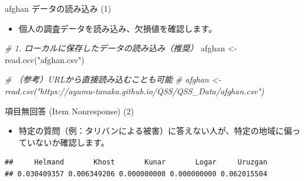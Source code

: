\documentclass[
  ignorenonframetext,
]{beamer}
\newenvironment{Shaded}{\begin{snugshade}}{\end{snugshade}}
\newcommand{\CommentTok}[1]{\textcolor[rgb]{0.56,0.35,0.01}{\textit{#1}}}
\newcommand{\FunctionTok}[1]{\textcolor[rgb]{0.00,0.00,0.00}{#1}}
\newcommand{\NormalTok}[1]{#1}
\newcommand{\OtherTok}[1]{\textcolor[rgb]{0.56,0.35,0.01}{#1}}
\newcommand{\SpecialCharTok}[1]{\textcolor[rgb]{0.00,0.00,0.00}{#1}}
\newcommand{\StringTok}[1]{\textcolor[rgb]{0.31,0.60,0.02}{#1}}
\providecommand{\tightlist}{%
  \setlength{\itemsep}{0pt}\setlength{\parskip}{0pt}}
\begin{document}
\begin{frame}[fragile]{afghan データの読み込み (1)}
\protect\hypertarget{afghan-ux30c7ux30fcux30bfux306eux8aadux307fux8fbcux307f-1}{}
\begin{itemize}
\tightlist
\item
  個人の調査データを読み込み、欠損値を確認します。
\end{itemize}

\scriptsize

\begin{Shaded}
\begin{Highlighting}[]
\CommentTok{\# 1. ローカルに保存したデータの読み込み（推奨）}
\NormalTok{afghan }\OtherTok{\textless{}{-}} \FunctionTok{read.csv}\NormalTok{(}\StringTok{"afghan.csv"}\NormalTok{)}

\CommentTok{\# （参考）URLから直接読み込むことも可能}
\CommentTok{\# afghan \textless{}{-} read.csv("https://ayumu{-}tanaka.github.io/QSS/QSS\_Data/afghan.csv")}
\end{Highlighting}
\end{Shaded}

\normalsize
\end{frame}

\begin{frame}[fragile]{項目無回答 (Item Nonresponse) (2)}
\protect\hypertarget{ux9805ux76eeux7121ux56deux7b54-item-nonresponse-2}{}
\begin{itemize}
\tightlist
\item
  特定の質問（例：タリバンによる被害）に答えない人が、特定の地域に偏っていないか確認します。
\end{itemize}

\scriptsize

\begin{Shaded}
\end{Shaded}

\begin{verbatim}
##     Helmand       Khost       Kunar       Logar     Uruzgan 
## 0.030409357 0.006349206 0.000000000 0.000000000 0.062015504
\end{verbatim}

\normalsize
\end{frame}
\end{document}
